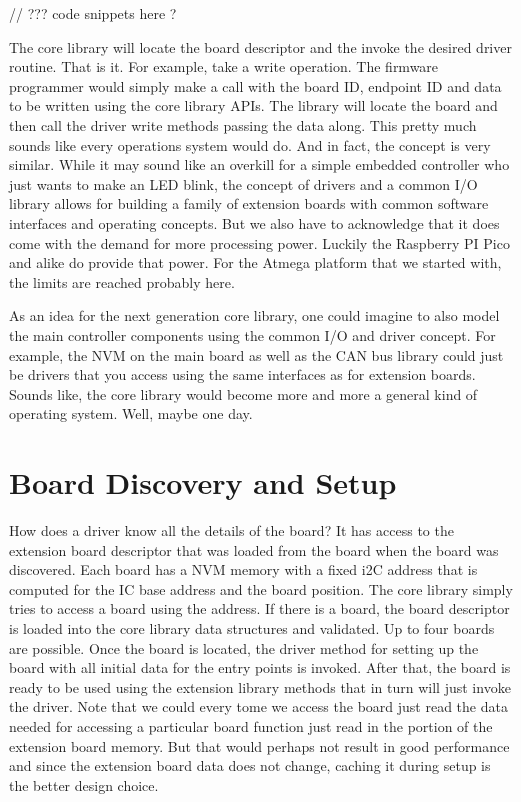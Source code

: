 // ??? code snippets here ?

The core library will locate the board descriptor and the invoke the desired driver routine. That is it. For example, take a write operation. The firmware programmer would simply make a call with the board ID, endpoint ID and data to be written using the core library APIs. The library will locate the board and then call the driver write methods passing the data along. This pretty much sounds like every operations system would do. And in fact, the concept is very similar. While it may sound like an overkill for a simple embedded controller who just wants to make an LED blink, the concept of drivers and a common I/O library allows for building a family of extension boards with common software interfaces and operating concepts. But we also have to acknowledge that it does come with the demand for more processing power. Luckily the Raspberry PI Pico and alike do provide that power. For the Atmega platform that we started with, the limits are reached probably here.

As an idea for the next generation core library, one could imagine to also model the main controller components using the common I/O and driver concept. For example, the NVM on the main board as well as the CAN bus library could just be drivers that you access using the same interfaces as for extension boards. Sounds like, the core library would become more and more a general kind of operating system. Well, maybe one day.

\section{Board Discovery and Setup}

How does a driver know all the details of the board? It has access to the extension board descriptor that was loaded from the board when the board was discovered. Each board has a NVM memory with a fixed i2C address that is computed for the IC base address and the board position. The core library simply tries to access a board using the address. If there is a board, the board descriptor is loaded into the core library data structures and validated. Up to four boards are possible. Once the board is located, the driver method for setting up the board with all initial data for the entry points is invoked. After that, the board is ready to be used using the extension library methods that in turn will just invoke the driver. Note that we could every tome we access the board just read the data needed for accessing a particular board function just read in the portion of the extension board memory. But that would perhaps not result in good performance and since the extension board data does not change, caching it during setup is the better design choice.

